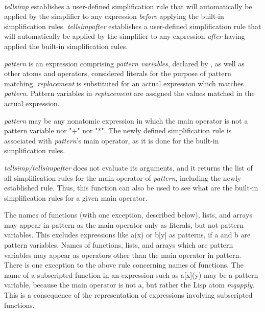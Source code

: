 \documentclass[../Maxima_Workbook.tex]{subfiles}
\begin{document}
 \hfill \tcr{[function]} \\
 \hfill \tcr{[function]}

\lz \emph{tellsimp} establishes a user-defined simplification rule that will automatically be applied by the simplifier to any expression \emph{before} applying the built-in simplification rules. \emph{tellsimpafter} establishes a user-defined simplification rule that will automatically be applied by the simplifier to any expression \emph{after} having applied the built-in simplification rules.

\lz \emph{pattern} is an expression comprising \emph{pattern variables}, declared by , as well as other atoms and operators, considered literals for the purpose of pattern matching. \emph{replacement} is substituted for an actual expression which matches \emph{pattern}. Pattern variables in \emph{replacement} are assigned the values matched in the actual expression.

\lz \emph{pattern} may be any nonatomic expression in which the main operator is not a pattern variable nor "+" nor "*". The newly defined simplification rule is associated with \emph{pattern}'s  main operator, as it is done for the built-in simplification rules.

\lz \emph{tellsimp/tellsimpafter} does not evaluate its arguments, and it returns the list of all simplification rules for the main operator of \emph{pattern}, including the newly established rule. Thus, this function can also be used to see what are the built-in simplification rules for a given main operator.

\lz The names of functions (with one exception, described below), lists, and arrays may appear in pattern as the main operator only as literals, but not pattern variables.  This excludes expressions like a(x) or b[y] as patterns, if a and b are pattern variables. Names of functions, lists, and arrays which are pattern variables may appear as operators other than the main operator in pattern. There is one exception to the above rule concerning names of functions. The name of a subscripted function in an expression such as a[x](y) may be a pattern variable, because the main operator is not a, but rather the Lisp atom \emph{mqapply}. This is a consequence of the representation of expressions involving subscripted functions.
\end{document}
